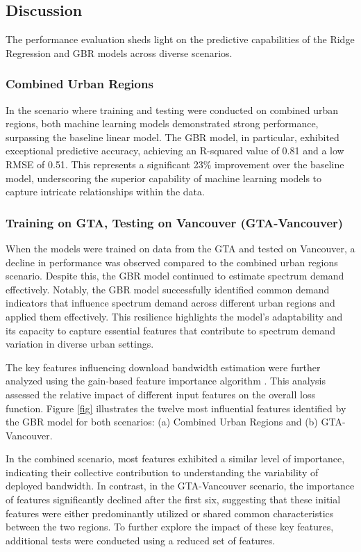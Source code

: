 \documentclass[conference]{IEEEtran}
\begin{document}
\subsection{Discussion}

The performance evaluation sheds light on the predictive capabilities of the Ridge Regression and GBR models across diverse scenarios.

\subsubsection{Combined Urban Regions}

In the scenario where training and testing were conducted on combined urban regions, both machine learning models demonstrated strong performance, surpassing the baseline linear model. The GBR model, in particular, exhibited exceptional predictive accuracy, achieving an R-squared value of 0.81 and a low RMSE of 0.51. This represents a significant 23\% improvement over the baseline model, underscoring the superior capability of machine learning models to capture intricate relationships within the data.

\subsubsection{Training on GTA, Testing on Vancouver (GTA-Vancouver)}

When the models were trained on data from the GTA and tested on Vancouver, a decline in performance was observed compared to the combined urban regions scenario. Despite this, the GBR model continued to estimate spectrum demand effectively. Notably, the GBR model successfully identified common demand indicators that influence spectrum demand across different urban regions and applied them effectively. This resilience highlights the model's adaptability and its capacity to capture essential features that contribute to spectrum demand variation in diverse urban settings.

The key features influencing download bandwidth estimation were further analyzed using the gain-based feature importance algorithm \cite{Manish2016}. This analysis assessed the relative impact of different input features on the overall loss function. Figure \ref{fig} illustrates the twelve most influential features identified by the GBR model for both scenarios: (a) Combined Urban Regions and (b) GTA-Vancouver.

In the combined scenario, most features exhibited a similar level of importance, indicating their collective contribution to understanding the variability of deployed bandwidth. In contrast, in the GTA-Vancouver scenario, the importance of features significantly declined after the first six, suggesting that these initial features were either predominantly utilized or shared common characteristics between the two regions. To further explore the impact of these key features, additional tests were conducted using a reduced set of features.
\end{document}
